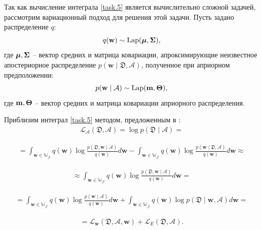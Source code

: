 Так как вычисление интеграла \ref{task.5} является вычислительно сложной задачей, рассмотрим вариационный подход \cite{Bishop2006} для решения этой задачи. Пусть задано распределение $q$:
\begin{equation} \label{task.6}
q(\mathbf{w}) \sim \operatorname{Lap}(\mbox{\boldmath$\mu$}, \mbox{\boldmath$\Sigma$}), 
\end{equation}
где $\mbox{\boldmath$\mu$}, \mbox{\boldmath$\Sigma$}$ -- вектор средних и матрица ковариации, апроксимирующие неизвестное апостериорное распределение $p(\mathbf{w} \mid \mathfrak{D}, \mathcal{A})$, полученное при априорном предположении:
\begin{equation} \label{task.7}
p(\mathbf{w} \mid \mathcal{A}) \sim \operatorname{Lap}(\mathbf{m}, \mbox{\boldmath$\Theta$}),
\end{equation}
где $\mathbf{m}, \mbox{\boldmath$\Theta$}$ -- вектор средних и матрица ковариации априорного распределения.

Приблизим интеграл \ref{task.5} методом, предложенным в \cite{Bishop2006}:
\[
\label{task.8}
\begin{aligned}
\mathcal{L}_{\mathcal{A}}(\mathfrak{D}, \mathcal{A}) = \log p(\mathfrak{D} \mid \mathcal{A}) = 
\end{aligned}
\]

\[
\begin{aligned}
= \int_{\mathbf{w \in \mathbb{W}_{\mathcal{J}}}} q(\mathbf{w}) \log \frac{p(\mathfrak{D}, \mathbf{w} \mid \mathcal{A})}{q(\mathbf{w})} d \mathbf{w} - \int_{\mathbf{w \in \mathbb{W}_{\mathcal{J}}}} q(\mathbf{w}) \log \frac{p(\mathbf{w} \mid \mathfrak{D}, \mathcal{A})}{q(\mathbf{w})} d \mathbf{w} \approx 
\end{aligned}
\]

\[
\begin{aligned}
\approx \int_{\mathbf{w \in \mathbb{W}_{\mathcal{J}}}} q(\mathbf{w}) \log \frac{p(\mathfrak{D}, \mathbf{w} \mid \mathcal{A})}{q(\mathbf{w})} d \mathbf{w} =
\end{aligned}
\]

\[
\begin{aligned}
= \int_{\mathbf{w \in \mathbb{W}_{\mathcal{J}}}} q(\mathbf{w}) \log \frac{p(\mathbf{w} \mid \mathcal{A})}{q(\mathbf{w})} d \mathbf{w} + \int_{\mathbf{w \in \mathbb{W}_{\mathcal{J}}}} q(\mathbf{w}) \log p(\mathfrak{D} \mid \mathbf{w}, \mathcal{A}) d \mathbf{w} = 
\end{aligned}
\]

\[
\begin{aligned}
= \mathcal{L}_{\mathbf{w}}(\mathfrak{D}, \mathcal{A}, \mathbf{w}) + \mathcal{L}_{E}(\mathfrak{D}, \mathcal{A}).
\end{aligned}
\]

